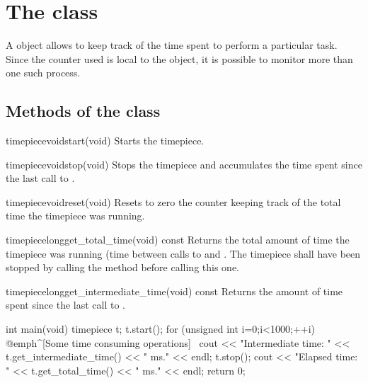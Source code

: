 \documentclass{manual}
\begin{document}
\section{The  class}\label{sec:timepiece}

A  object allows to keep track of the time spent to perform
a particular task. Since the counter used is local to the object, it is possible
to monitor more than one such process.

\subsection{Methods of the  class}

\begin{defmethod}{timepiece}{void}{start}{(void)}
  Starts the timepiece.
\end{defmethod}

\begin{defmethod}{timepiece}{void}{stop}{(void)}
  Stops the timepiece and accumulates the time spent since the last call to .
\end{defmethod}

\begin{defmethod}{timepiece}{void}{reset}{(void)}
  Resets to zero the counter keeping track of the total time the timepiece was running.
\end{defmethod}

\begin{defmethod}{timepiece}{long}{get\_total\_time}{(void) const}
  Returns the total amount of time the timepiece was running (time between calls to
   and . The timepiece shall have been stopped by calling the
   method before calling this one.
\end{defmethod}

\begin{defmethod}{timepiece}{long}{get\_intermediate\_time}{(void) const}
  Returns the amount of time spent since the last call to .
\end{defmethod}


\begin{example}
int main(void)
{
  timepiece t;
  t.start();
  for (unsigned int i=0;i<1000;++i) {
     @emph^[Some time consuming operations]~
     cout << "Intermediate time: "
          << t.get_intermediate_time() << " ms." << endl;
  }
  t.stop();
  cout << "Elapsed time: " << t.get_total_time() << " ms." << endl;
  return 0;
}
\end{example}
\end{document}
